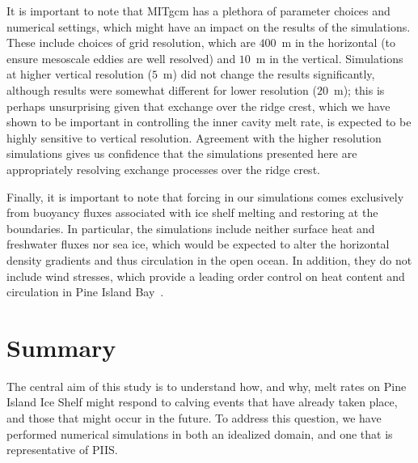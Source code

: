 \documentclass[draft]{agujournal2019}
\begin{document}
It is important to note that MITgcm has a plethora of parameter choices and numerical settings, which might have an impact on the results of the simulations. These include choices of grid resolution, which are $400$~m in the horizontal (to ensure mesoscale eddies are well resolved) and $10$~m in the vertical. Simulations at higher vertical resolution ($5$~m) did not change the results significantly, although results were somewhat different for lower resolution ($20$~m); this is perhaps unsurprising given that exchange over the ridge crest, which we have shown to be important in controlling the inner cavity melt rate, is expected to be highly sensitive to vertical resolution. Agreement with the higher resolution simulations gives us confidence that the simulations presented here are appropriately resolving exchange processes over the ridge crest.


Finally, it is important to note that forcing in our simulations comes exclusively from buoyancy fluxes associated with ice shelf melting and restoring at the boundaries. In particular, the simulations include neither surface heat and freshwater fluxes nor sea ice, which would be expected to alter the horizontal density gradients and thus circulation in the open ocean. In addition, they do not include wind stresses, which provide a leading order control on heat content and circulation in Pine Island Bay~\cite{Dutrieux2014Science}.

\section{Summary}\label{S:Summary}
The central aim of this study is to understand how, and why, melt rates on Pine Island Ice Shelf might respond to calving events that have already taken place, and those that might occur in the future. To address this question, we have performed numerical simulations in both an idealized domain, and one that is representative of PIIS.
\end{document}
